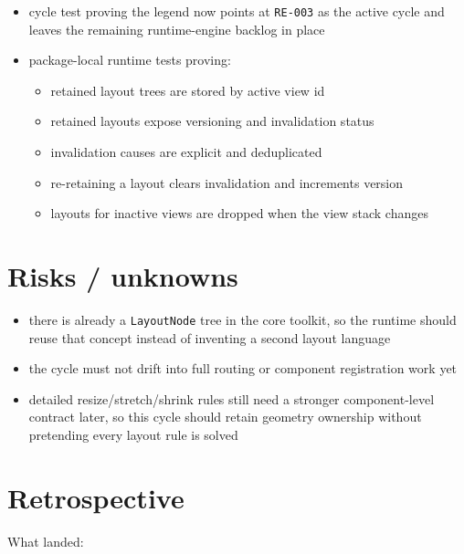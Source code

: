 \begin{itemize}
\tightlist
\item
  cycle test proving the legend now points at \texttt{R\allowbreak{}E\allowbreak{}-\allowbreak{}0\allowbreak{}0\allowbreak{}3} as the active cycle and leaves the remaining runtime-engine backlog in place
\item
  package-local runtime tests proving:

  \begin{itemize}
  \tightlist
  \item
    retained layout trees are stored by active view id
  \item
    retained layouts expose versioning and invalidation status
  \item
    invalidation causes are explicit and deduplicated
  \item
    re-retaining a layout clears invalidation and increments version
  \item
    layouts for inactive views are dropped when the view stack changes
  \end{itemize}
\end{itemize}

\section{Risks / unknowns}\label{record-151-risks-unknowns}

\begin{itemize}
\tightlist
\item
  there is already a \texttt{L\allowbreak{}a\allowbreak{}y\allowbreak{}o\allowbreak{}u\allowbreak{}t\allowbreak{}N\allowbreak{}o\allowbreak{}d\allowbreak{}e} tree in the core toolkit, so the runtime should reuse that concept instead of inventing a second layout language
\item
  the cycle must not drift into full routing or component registration work yet
\item
  detailed resize/stretch/shrink rules still need a stronger component-level contract later, so this cycle should retain geometry ownership without pretending every layout rule is solved
\end{itemize}

\section{Retrospective}\label{record-151-retrospective}

What landed:

